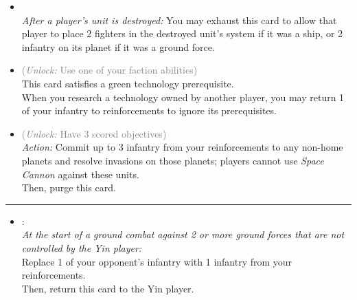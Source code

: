 \begin{multicols}{2}
\begin{itemize}
\item {}\\
\emph{After a player's unit is destroyed:} You may exhaust this card to allow that player to place 2 fighters in the destroyed unit's system if it was a ship, or 2 infantry on its planet if it was a ground force.
\item {} \textcolor{gray}{(\emph{Unlock:} Use one of your faction abilities)}\\
This card satisfies a green technology prerequisite.\\
When you research a technology owned by another player, you may return 1 of your infantry to reinforcements to ignore its prerequisites.
\item {} \textcolor{gray}{(\emph{Unlock:} Have 3 scored objectives)}\\
\emph{Action:} Commit up to 3 infantry from your reinforcements to any non-home planets and resolve invasions on those planets; players cannot use \emph{Space Cannon} against these units.\\
Then, purge this card.
\end{itemize}

\vspace{-10pt}\rule{\hsize}{0.4pt}\vspace{5pt}


\begin{itemize}
\item {}:\\
\emph{At the start of a ground combat against 2 or more ground forces that are not controlled by the Yin player:}\\
Replace 1 of your opponent's infantry with 1 infantry from your reinforcements.\\
Then, return this card to the Yin player.
\end{itemize}

\end{multicols}



